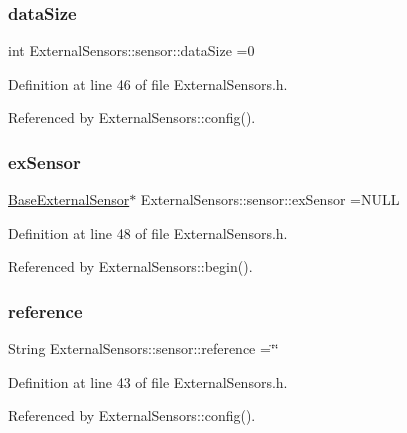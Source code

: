 \subsubsection{\texorpdfstring{data\+Size}{dataSize}}
{\footnotesize\ttfamily int External\+Sensors\+::sensor\+::data\+Size =0}



Definition at line 46 of file External\+Sensors.\+h.



Referenced by External\+Sensors\+::config().

\mbox{\label{structExternalSensors_1_1sensor_a9bca150fd468b8d0e090e6d72c5c2b48}} 
\subsubsection{\texorpdfstring{ex\+Sensor}{exSensor}}
{\footnotesize\ttfamily \hyperlink{classBaseExternalSensor}{Base\+External\+Sensor}$\ast$ External\+Sensors\+::sensor\+::ex\+Sensor =N\+U\+LL}



Definition at line 48 of file External\+Sensors.\+h.



Referenced by External\+Sensors\+::begin().

\mbox{\label{structExternalSensors_1_1sensor_afed5bdfd49732202a368b600cb8396fe}} 
\subsubsection{\texorpdfstring{reference}{reference}}
{\footnotesize\ttfamily String External\+Sensors\+::sensor\+::reference =\char`\"{}\char`\"{}}



Definition at line 43 of file External\+Sensors.\+h.



Referenced by External\+Sensors\+::config().

\mbox{\label{structExternalSensors_1_1sensor_a6acfdb02c742c2110d7bd2b5d9fce9e7}} 
